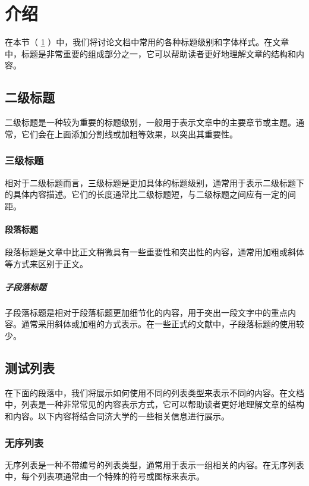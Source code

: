 \section{介绍}\label{sec:introduction}

在本节（ \cref{sec:introduction} ）中，我们将讨论文档中常用的各种标题级别和字体样式。在文章中，标题是非常重要的组成部分之一，它可以帮助读者更好地理解文章的结构和内容。

\subsection{二级标题}

二级标题是一种较为重要的标题级别，一般用于表示文章中的主要章节或主题。通常，它们会在上面添加分割线或加粗等效果，以突出其重要性。

\subsubsection{三级标题}

相对于二级标题而言，三级标题是更加具体的标题级别，通常用于表示二级标题下的具体内容描述。它们的长度通常比二级标题短，与二级标题之间应有一定的间距。

\paragraph{段落标题}

段落标题是文章中比正文稍微具有一些重要性和突出性的内容，通常用加粗或斜体等方式来区别于正文。

\subparagraph{子段落标题}

子段落标题是相对于段落标题更加细节化的内容，用于突出一段文字中的重点内容。通常采用斜体或加粗的方式表示。在一些正式的文献中，子段落标题的使用较少。

\subsection{测试列表}

在下面的段落中，我们将展示如何使用不同的列表类型来表示不同的内容。在文档中，列表是一种非常常见的内容表示方式，它可以帮助读者更好地理解文章的结构和内容。以下内容将结合同济大学的一些相关信息进行展示。

\subsubsection{无序列表}

无序列表是一种不带编号的列表类型，通常用于表示一组相关的内容。在无序列表中，每个列表项通常由一个特殊的符号或图标来表示。

